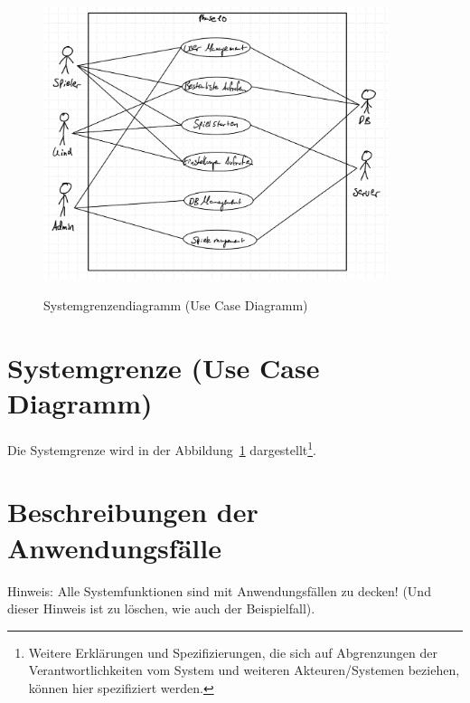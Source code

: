 \begin{figure}
\centering	
\includegraphics[width=0.9\textwidth]{img/use_case_diagram.jpeg}
\label{fig:sys}
\caption{Systemgrenzendiagramm (Use Case Diagramm)}
\end{figure}

\section{Systemgrenze (Use Case Diagramm)}

Die Systemgrenze wird in der Abbildung~\ref{fig:sys} dargestellt\footnote{Weitere Erklärungen und Spezifizierungen, die sich auf Abgrenzungen der Verantwortlichkeiten vom System und weiteren Akteuren/Systemen beziehen, können hier spezifiziert werden.}. 


\section{Beschreibungen der Anwendungsfälle}

Hinweis: Alle Systemfunktionen sind mit Anwendungsfällen zu decken! (Und dieser Hinweis ist zu löschen, wie auch der Beispielfall).

\setcounter{uc}{10}

